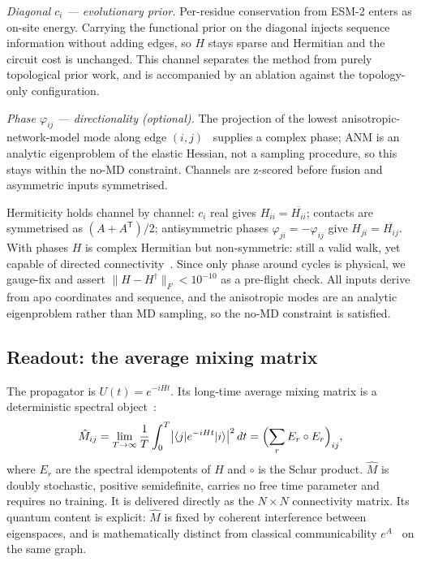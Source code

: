 \documentclass[10pt,a4paper]{article}
\newcommand{\Mhat}{\hat{M}}
\begin{document}
\emph{Diagonal $c_i$ --- evolutionary prior.} Per-residue conservation from ESM-2
enters as on-site energy. Carrying the functional prior on the diagonal injects sequence information
without adding edges, so $H$ stays sparse and Hermitian and the circuit cost is unchanged. This
channel separates the method from purely topological prior work, and is accompanied by an ablation
against the topology-only configuration.

\emph{Phase $\varphi_{ij}$ --- directionality (optional).} The projection of the lowest
anisotropic-network-model mode along edge $(i,j)$~\cite{atilgan2001} supplies a complex phase; ANM is
an analytic eigenproblem of the elastic Hessian, not a sampling procedure, so this stays within the
no-MD constraint. Channels are z-scored before fusion and asymmetric inputs symmetrised.

Hermiticity holds channel by channel: $c_i$ real gives $H_{ii} = \overline{H_{ii}}$; contacts are
symmetrised as $(A + A^{\mathsf T})/2$; antisymmetric phases $\varphi_{ji} = -\varphi_{ij}$ give
$H_{ji} = \overline{H_{ij}}$. With phases $H$ is complex Hermitian but non-symmetric: still a valid
walk, yet capable of directed connectivity~\cite{lu2016}. Since only phase around cycles is
physical, we gauge-fix and assert $\lVert H - H^{\dagger}\rVert_F < 10^{-10}$ as a pre-flight check.
All inputs derive from apo coordinates and sequence, and the anisotropic modes are an analytic
eigenproblem rather than MD sampling, so the no-MD constraint is satisfied.

\subsection{Readout: the average mixing matrix}

The propagator is $U(t) = e^{-iHt}$. Its long-time average mixing matrix is a deterministic spectral
object~\cite{godsil2013}:
\begin{equation}
\Mhat_{ij}
  = \lim_{T\to\infty}\frac{1}{T}\int_{0}^{T}\bigl|\langle j|e^{-iHt}|i\rangle\bigr|^{2}\,dt
  = \Bigl(\sum_{r} E_r \circ E_r\Bigr)_{ij},
\end{equation}
where $E_r$ are the spectral idempotents of $H$ and $\circ$ is the Schur product. $\Mhat$ is doubly
stochastic, positive semidefinite, carries no free time parameter and requires no training. It is
delivered directly as the $N\times N$ connectivity matrix. Its quantum content is explicit: $\Mhat$
is fixed by coherent interference between eigenspaces, and is mathematically distinct from classical
communicability $e^{A}$~\cite{estrada2008} on the same graph.
\end{document}
